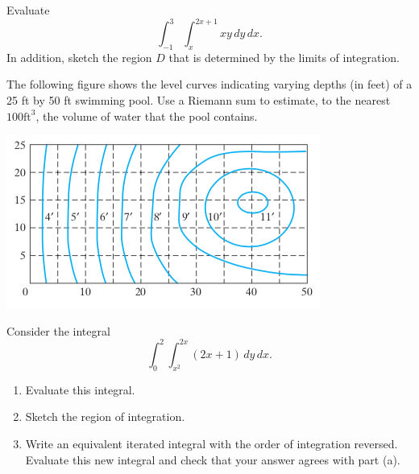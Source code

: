 \documentclass[11pt,letterpaper,boxed]{hmcpset}
\begin{document}
\begin{solution}
\vfill
\end{solution}
\newpage

\begin{problem}[Colley 5.2 \#7]
Evaluate
\[
	\int_{-1}^3 \int_x^{2x+1}xy\,dy\,dx.
\]
In addition, sketch the region $D$ that is determined by the limits of integration.
\end{problem}

\begin{solution}
\vfill
\end{solution}
\newpage

\begin{problem}[Colley 5.2 \#14]
The following figure shows the level curves indicating varying depths (in feet) of a 25 ft by 50 ft swimming pool. Use a Riemann sum to estimate, to the 
nearest $100 \text{ft}^3$, the volume of water that the pool contains.
\begin{center}
\includegraphics[scale=0.65]{prob3.png}
\end{center}
\end{problem}

\begin{solution}
\vfill
\end{solution}
\newpage

\begin{problem}[Colley 5.3 \#1]
Consider the integral
\[
	\int_0^2\int_{x^2}^{2x}(2x+1)\,dy\,dx.
\]
\begin{enumerate}
\item Evaluate this integral.
\item Sketch the region of integration.
\item Write an equivalent iterated integral with the order of integration reversed. Evaluate this new integral and check that your answer agrees with part (a).
\end{enumerate}
\end{problem}
\end{document}
